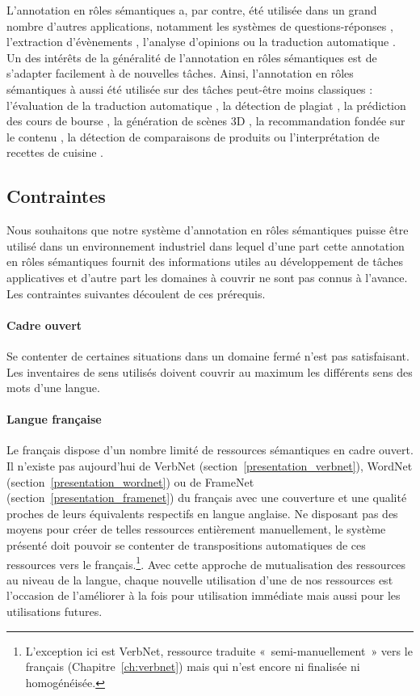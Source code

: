 L'annotation en rôles sémantiques a, par contre, été utilisée dans un grand
nombre d'autres applications, notamment les systèmes de questions-réponses
\citep{shen2007using}, l'extraction d'évènements \citep{exner2011using},
l'analyse d'opinions \citep{das2012structure} ou la traduction automatique
\citep{bazrafshan2013semantic,bazrafshan2014comparing}. Un des intérêts de la
généralité de l'annotation en rôles sémantiques est de s'adapter facilement à
de nouvelles tâches. Ainsi, l'annotation en rôles sémantiques à aussi été
utilisée sur des tâches peut-être moins classiques : l'évaluation de la
traduction automatique \citep{lo2011meant,chuchunkov2014applying}, la détection
de plagiat \citep{osman2012improved}, la prédiction des cours de bourse
\citep{xie2013semantic}, la génération de scènes 3D \citep{chang2014learning},
la recommandation fondée sur le contenu \citep{de2014exploiting}, la détection
de comparaisons de produits \citep{kessler2013detection} ou l'interprétation de
recettes de cuisine \citep{malmaud2014cooking}.

\subsection{Contraintes}

Nous souhaitons que notre système d'annotation en rôles sémantiques puisse être
utilisé dans un environnement industriel dans lequel d'une part cette
annotation en rôles sémantiques fournit des informations utiles au
développement de tâches applicatives et d'autre part les domaines à couvrir ne
sont pas connus à l'avance. Les contraintes suivantes découlent de ces
prérequis.

\paragraph{Cadre ouvert} Se contenter de certaines situations dans un domaine
fermé n'est pas satisfaisant. Les inventaires de sens utilisés doivent couvrir
au maximum les différents sens des mots d'une langue.

\paragraph{Langue française} Le français dispose d'un nombre limité de
ressources sémantiques en cadre ouvert. Il n'existe pas aujourd'hui de VerbNet
(section~\ref{presentation_verbnet}), WordNet
(section~\ref{presentation_wordnet}) ou de FrameNet
(section~\ref{presentation_framenet}) du français avec une couverture et une
qualité proches de leurs équivalents respectifs en langue anglaise. Ne
disposant pas des moyens pour créer de telles ressources entièrement
manuellement, le système présenté doit pouvoir se contenter de transpositions
automatiques de ces ressources vers le français.\footnote{L'exception ici est
VerbNet, ressource traduite «~semi-manuellement~» vers le français
(Chapitre~\ref{ch:verbnet}) mais qui n'est encore ni finalisée ni
homogénéisée.}. Avec cette approche de mutualisation des ressources au niveau de
la langue, chaque nouvelle utilisation d'une de nos ressources est l'occasion
de l'améliorer à la fois pour utilisation immédiate mais aussi pour les
utilisations futures.


